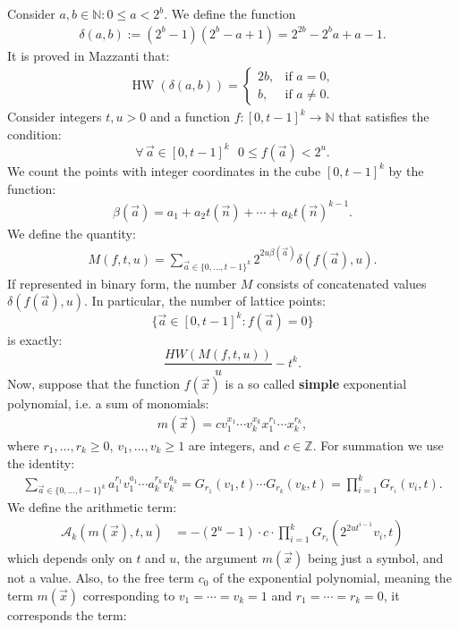 \documentclass[10pt]{article}
\theoremstyle{plain}
\newcommand{\HW}{\operatorname{HW}}
\newcommand{\Z}{\mathbb{Z}}
\begin{document}
Consider $a,b \in \mathbb{N} : 0 \leq a < 2^b$. We define the function
\begin{align}
\delta(a,b) := (2^b - 1)(2^b - a + 1) = 2^{2b} - 2^b a + a - 1.
\end{align}
It is proved in Mazzanti \cite{mazzanti2002plainbases} that:
\begin{align*}
\HW(\delta(a,b)) = \begin{cases}
2b, & \text{if } a = 0, \\
b, & \text{if } a \neq 0.
\end{cases}
\end{align*}
Consider integers $t, u > 0$ and a function $f : [0, t-1]^k \rightarrow \mathbb{N}$ that satisfies the condition:
$$\forall \,\vec a \in [0, t-1]^k\,\,\,\, 0 \leq f(\vec a) < 2^u.$$
We count the points with integer coordinates in the cube $[0, t-1]^k$ by the function:
\begin{align*}
\beta(\vec{a}) = a_1 + a_2 t(\vec{n}) + \cdots + a_k t(\vec{n})^{k-1}.
\end{align*}
We define the quantity:
\begin{align*}
M (f,t,u) = \sum_{\vec{a} \in \{0, \dots, t-1\}^k} 2^{2u \beta(\vec{a})} \delta(f(\vec{a}), u).
\end{align*}
If represented in binary form, the number $M$ consists of concatenated values $\delta(f(\vec a), u)$. In particular, the number of lattice points:
$$\{\vec a \in [0, t-1]^k : f(\vec a) = 0 \}$$
is exactly:
$$\frac{HW(M(f,t,u))}{u} - t^k.$$
Now, suppose that the function $f(\vec x)$ is a so called {\bf simple} exponential polynomial, i.e. a sum of monomials:
\begin{align*}
m(\vec x) = c v_1^{x_1} \cdots v_k^{x_k} x_1^{r_1} \cdots x_k^{r_k},
\end{align*}
where $r_1, \ldots, r_k \geq 0$, $v_1, \ldots, v_k \geq 1$ are integers, and $c \in \Z$. For summation we use the identity:
\begin{align*}
\sum_{\vec{a} \in \{0, \dots, t-1\}^k}
a_1^{r_1} v_1^{a_1}
\cdots a_k^{r_k} v_k^{a_k} = G_{r_1}(v_1, t)
\cdots G_{r_k}(v_k, t)
= \prod_{i=1}^k G_{r_i}(v_i, t) .
\end{align*}
We define the arithmetic term:
\begin{align} \label{TermA}
\mathcal{A}_k(m(\vec{x}), t, u)
&= -(2^{u} - 1) \cdot c
\cdot
\prod_{i=1}^k G_{r_i}(2^{2u t^{i-1}} v_i, t)
\end{align}
which depends only on $t$ and $u$, the argument $m(\vec x)$ being just a symbol, and not a value. Also, to the free term $c_0$ of the exponential polynomial, meaning the term $m(\vec x)$ corresponding to $v_1 = \cdots = v_k = 1$ and $r_1 = \cdots = r_k = 0$, it corresponds the term:
\end{document}
